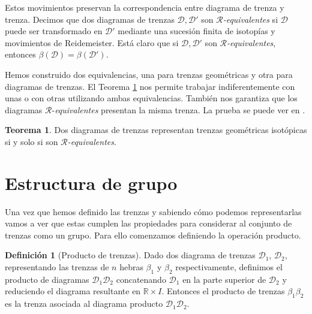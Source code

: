 \documentclass[12pt]{book}
\theoremstyle{definition}
\newtheorem{defi}{Definición}[section]
\newtheorem{teor}{Teorema}[section]
\begin{document}
Estos movimientos preservan la correspondencia entre diagrama de trenza y trenza. Decimos que dos diagramas de trenzas $\mathcal{D}, \mathcal{D}'$ son $\mathcal{R}$\textit{-equivalentes} si $\mathcal{D}$ puede ser transformado en $\mathcal{D}'$ mediante una sucesión finita de isotopías y movimientos de Reidemeister. Está claro que si $\mathcal{D}, \mathcal{D}'$ son $\mathcal{R}$\textit{-equivalentes}, entonces $\beta(\mathcal{D}) = \beta(\mathcal{D'})$.

Hemos construido dos equivalencias, una para trenzas geométricas y otra para diagramas de trenzas. El Teorema \ref{teor:equiv} nos permite trabajar indiferentemente con unas o con otras utilizando ambas equivalencias. También nos garantiza que los diagramas $\mathcal{R}$-\textit{equivalentes} presentan la misma trenza. La prueba se puede ver en \cite{br_gr}.


\begin{teor}
Dos diagramas de trenzas representan trenzas geométricas isotópicas si y solo si son $\mathcal{R}$\textit{-equivalentes}.
\label{teor:equiv}
\end{teor}




\section{Estructura de grupo}

Una vez que hemos definido las trenzas y sabiendo cómo podemos representarlas vamos a ver que estas cumplen las propiedades para considerar al conjunto de trenzas como un grupo. Para ello comenzamos definiendo la operación producto.

\begin{defi}[Producto de trenzas]
Dado dos diagrama de trenzas $\mathcal{D}_1$, $\mathcal{D}_2$, representando las trenzas de $n$ hebras $\beta_1$ y $\beta_2$ respectivamente, definimos el producto de diagramas $\mathcal{D}_1\mathcal{D}_2$ concatenando $\mathcal{D}_1$ en la parte superior de $\mathcal{D}_2$ y reduciendo el diagrama resultante en $\mathbb{R}\times I$. Entonces el producto de trenzas $\beta_1\beta_2$ es la trenza  asociada al diagrama producto $\mathcal{D}_1\mathcal{D}_2$.

\end{defi} 
\end{document}
